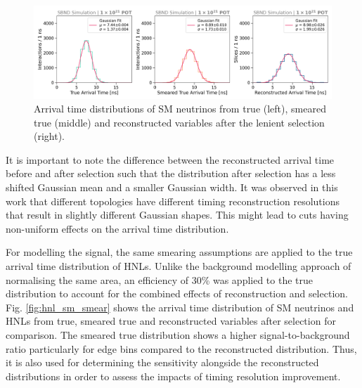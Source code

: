 \begin{figure}[ht!]
    \centering
    \includegraphics[width=\textwidth]{truth_smear_reco_gaus.png}
    \caption[Arrival Time of SM Neutrinos with an Improved Timing Resolution]{Arrival time distributions of SM neutrinos from true (left), smeared true (middle) and reconstructed variables after the lenient selection (right).}
    \label{fig:gaus_truth_smear}
\end{figure}


It is important to note the difference between the reconstructed arrival time before and after selection such that the distribution after selection has a less shifted Gaussian mean and a smaller Gaussian width.
It was observed in this work that different topologies have different timing reconstruction resolutions that result in slightly different Gaussian shapes. 
This might lead to cuts having non-uniform effects on the arrival time distribution.

For modelling the signal, the same smearing assumptions are applied to the true arrival time distribution of HNLs. 
Unlike the background modelling approach of normalising the same area, an efficiency of 30\% was applied to the true distribution to account for the combined effects of reconstruction and selection.
Fig. \ref{fig:hnl_sm_smear} shows the arrival time distribution of SM neutrinos and HNLs from true, smeared true and reconstructed variables after selection for comparison. 
The smeared true distribution shows a higher signal-to-background ratio particularly for edge bins compared to the reconstructed distribution.
Thus, it is also used for determining the sensitivity alongside the reconstructed distributions in order to assess the impacts of timing resolution improvement.

